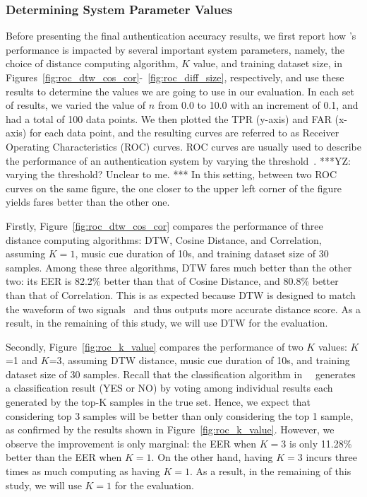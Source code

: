 \subsubsection{Determining System Parameter Values}
Before presenting the final authentication accuracy results, we first report how \systemname's performance is impacted by several important system parameters, namely, the choice of distance computing algorithm, $K$ value, and training dataset size, in Figures~\ref{fig:roc_dtw_cos_cor}-~\ref{fig:roc_diff_size}, respectively, and use these results to determine the values we are going to use in our evaluation. In each set of results, we varied the value of $n$ from 0.0 to 10.0 with an increment of 0.1, and had a total of 100 data points. We then plotted the TPR (y-axis) and FAR (x-axis) for each data point, and the resulting curves are referred to as Receiver Operating Characteristics (ROC) curves. ROC curves are usually used to describe the performance of an authentication system by varying the threshold~\cite{hanley1982meaning}.  ***YZ: varying the threshold? Unclear to me. *** In this setting, between two ROC curves on the same figure, the one closer to the upper left corner of the figure yields fares better than the other one.

Firstly, Figure~\ref{fig:roc_dtw_cos_cor} compares the performance of three distance computing algorithms: DTW, Cosine Distance, and Correlation, assuming $K=1$, music cue duration of 10s, and training dataset size of 30 samples.  Among these three algorithms, DTW fares much better than the other two: its EER is 82.2\% better than that of Cosine Distance, and 80.8\% better than that of Correlation. This is as expected because DTW is designed to match the waveform of two signals~\cite{dtw} and thus outputs more accurate distance score. As a result, in the remaining of this study, we will use DTW for the evaluation.


Secondly, Figure~\ref{fig:roc_k_value} compares the performance of two $K$ values: $K$=1 and $K$=3, assuming DTW distance, music cue duration of 10s, and training dataset size of 30 samples.  Recall that the classification algorithm in ~\systemname~generates a classification result (YES or NO) by voting among individual results each generated by the top-K samples in the true set. Hence, we expect that considering top 3 samples will be better than only considering the top 1 sample, as confirmed by the results shown in Figure~\ref{fig:roc_k_value}. However, we observe the improvement is only marginal: the EER when $K=3$ is only 11.28\% better than the EER when $K=1$. On the other hand, having $K=3$ incurs three times as much computing as having $K=1$. As a result, in the remaining of this study, we will use $K=1$ for the evaluation.

